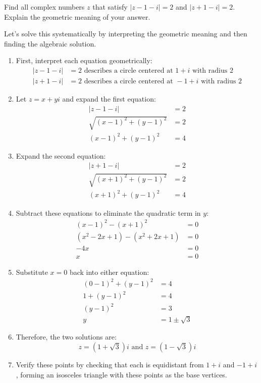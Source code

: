 \begin{example}
Find all complex numbers $z$ that satisfy $|z-1-i| = 2$ and $|z+1-i| = 2$. Explain the geometric meaning of your answer.

\begin{solution}
Let's solve this systematically by interpreting the geometric meaning and then finding the algebraic solution.

\begin{enumerate}
\item First, interpret each equation geometrically:
   \begin{align*}
   |z-1-i| &= 2 \text{ describes a circle centered at } 1+i \text{ with radius 2} \\
   |z+1-i| &= 2 \text{ describes a circle centered at } -1+i \text{ with radius 2}
   \end{align*}

\item Let $z = x + yi$ and expand the first equation:
   \begin{align*}
   |z-1-i| &= 2 \\
   \sqrt{(x-1)^2 + (y-1)^2} &= 2 \\
   (x-1)^2 + (y-1)^2 &= 4
   \end{align*}

\item Expand the second equation:
   \begin{align*}
   |z+1-i| &= 2 \\
   \sqrt{(x+1)^2 + (y-1)^2} &= 2 \\
   (x+1)^2 + (y-1)^2 &= 4
   \end{align*}

\item Subtract these equations to eliminate the quadratic term in $y$:
   \begin{align*}
   (x-1)^2 - (x+1)^2 &= 0 \\
   (x^2-2x+1) - (x^2+2x+1) &= 0 \\
   -4x &= 0 \\
   x &= 0
   \end{align*}

\item Substitute $x=0$ back into either equation:
   \begin{align*}
   (0-1)^2 + (y-1)^2 &= 4 \\
   1 + (y-1)^2 &= 4 \\
   (y-1)^2 &= 3 \\
   y &= 1 \pm \sqrt{3}
   \end{align*}

\item Therefore, the two solutions are:
   \[
   z = (1+\sqrt{3})i \text{ and } z = (1-\sqrt{3})i
   \]

\item Verify these points by checking that each is equidistant from $1+i$ and $-1+i$, forming an isosceles triangle with these points as the base vertices.
\end{enumerate}
\end{solution}
\end{example}
\exampleline


